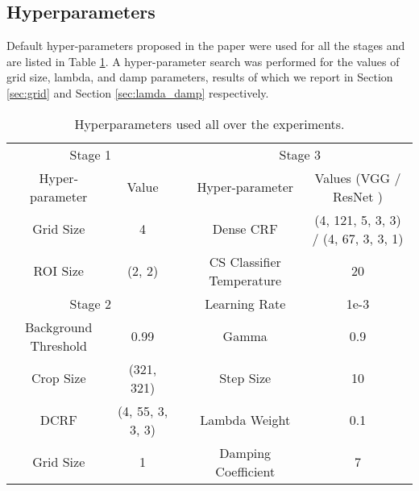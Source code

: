 \subsection{Hyperparameters}
Default hyper-parameters proposed in the paper were used for all the stages and are listed in Table \ref{tab:hyperparameter}. A hyper-parameter search was performed for the values of grid size, lambda, and damp parameters, results of which we report in Section \ref{sec:grid} and Section \ref{sec:lamda_damp} respectively. 

\begin{table}[ht!]
\begin{center}
\begin{tabular}{ccccc}
\cmidrule[1pt]{1-2}\cmidrule[1pt]{4-5}
\multicolumn{2}{c}{Stage 1}             &  & \multicolumn{2}{c}{Stage 3}                                      \\ \cmidrule[1pt]{1-2}\cmidrule[1pt]{4-5}
Hyper-parameter      & Value            &  & Hyper-parameter           & Values (VGG \cite{vgg16} / ResNet \cite{resnet})                \\ \cmidrule{1-2}\cmidrule{4-5}
Grid Size            & 4                &  & Dense CRF                 & (4, 121, 5, 3, 3) / (4, 67, 3, 3, 1) \\
ROI Size             & (2, 2)           &  & CS Classifier Temperature & 20                                   \\ \cmidrule{1-2}
\multicolumn{2}{c}{Stage 2}             &  & Learning Rate             & 1e-3                                 \\ \cmidrule{1-2}
Background Threshold & 0.99             &  & Gamma                     & 0.9                                  \\
Crop Size            & (321, 321)       &  & Step Size                 & 10                                   \\
DCRF                 & (4, 55, 3, 3, 3) &  & Lambda Weight             & 0.1                                  \\
Grid Size            & 1                &  & Damping Coefficient       & 7                                    \\ \cmidrule[0.6pt]{1-2}\cmidrule[0.6pt]{4-5}
\end{tabular}
\vspace{1mm}
\caption{Hyperparameters used all over the experiments.}
\label{tab:hyperparameter}
\end{center}
\end{table}


